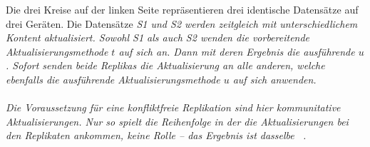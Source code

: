 %
Die drei Kreise auf der linken Seite repräsentieren drei identische Datensätze auf drei Geräten.
Die Datensätze \it{S1} und \it{S2} werden zeitgleich mit unterschiedlichem Kontent aktualisiert.
Sowohl \it{S1} als auch \it{S2} wenden die vorbereitende Aktualisierungsmethode $t$ auf sich an.
Dann mit deren Ergebnis die ausführende $u$.
Sofort senden beide Replikas die Aktualisierung an alle anderen, welche ebenfalls die ausführende Aktualisierungsmethode $u$ auf sich anwenden.\\\\
Die Voraussetzung für eine konfliktfreie Replikation sind hier kommunitative Aktualisierungen.
Nur so spielt die Reihenfolge in der die Aktualisierungen bei den Replikaten ankommen, keine Rolle -- das Ergebnis ist dasselbe ~\cite{crdt_shapiro2}.
%
%
